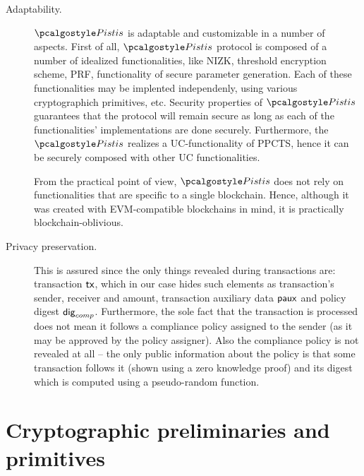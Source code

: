 \documentclass[runningheads,10pt]{llncs}
\numberwithin{equation}{section}
\begin{document}
\begin{description}
\item[{Adaptability.}]
  $\pistis$ is adaptable and customizable in a number of aspects. First of all,
  $\pistis$ protocol is composed of a number of idealized functionalities, like
  NIZK, threshold encryption scheme, PRF, functionality of secure parameter
  generation. Each of these functionalities may be implented independenly, using
  various cryptographich primitives, etc. Security properties of $\pistis$
  guarantees that the protocol will remain secure as long as each of the
  functionalities' implementations are done securely.
  Furthermore, the $\pistis$ realizes a UC-functionality of PPCTS, hence it can
  be securely composed with other UC functionalities.

  From the practical point of view, $\pistis$ does not rely on functionalities that
  are specific to a single blockchain. Hence, although it was created with EVM-compatible blockchains in mind, it is practically blockchain-oblivious.


\item[{Privacy preservation.}] This is assured since the only things revealed
  during transactions are: transaction $\mathsf{tx}$, which in our case hides such
  elements as transaction's sender, receiver and amount, transaction auxiliary
  data $\mathsf{paux}$ and policy digest $\mathsf{dig}_{comp}$. Furthermore, the sole
  fact that the transaction is processed does not mean it follows a compliance
  policy assigned to the sender (as it may be approved by the policy
  assigner). Also the compliance policy is not revealed at all -- the only
  public information about the policy is that some transaction follows it (shown
  using a zero knowledge proof) and its digest which is computed using a
  pseudo-random function.
\end{description}

\section{Cryptographic preliminaries and primitives}\label{crypto-preliminaries:zkps}
\end{document}
